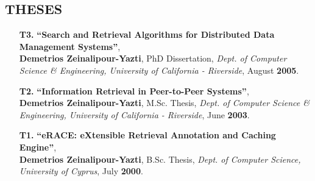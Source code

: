 \documentclass[10pt]{article}
\begin{document}
\subsection*{\bf THESES}
\begin{itemize}
\item [{\bf T3.}]
\label{T3}
{\bf ``Search and Retrieval Algorithms for Distributed Data Management Systems''}, \\
{\bf Demetrios Zeinalipour-Yazti}, PhD Dissertation,  
{\em Dept. of Computer Science \& Engineering, University of California - Riverside}, 
August {\bf 2005}.    

\item [{\bf T2.}]
\label{T2}
{\bf ``Information Retrieval in Peer-to-Peer Systems''}, \\
{\bf Demetrios Zeinalipour-Yazti}, M.Sc. Thesis,  
{\em Dept. of Computer Science \& Engineering, University of California - Riverside}, 
June {\bf 2003}.    

\item [{\bf T1.}]
\label{T1}
{\bf ``eRACE: eXtensible Retrieval Annotation and Caching Engine''}, \\
{\bf Demetrios Zeinalipour-Yazti}, B.Sc. Thesis,  
{\em Dept. of Computer Science, University of Cyprus}, 
July {\bf 2000}.

\end{itemize}
\end{document}
